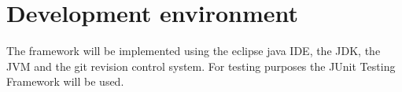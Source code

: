 \section{Development environment}

The framework will be implemented using the \Gls{eclipse} \gls{java} \gls{IDE}, the \Gls{JDK}, the \Gls{JVM} and the \Gls{git} revision control system. For testing purposes the JUnit Testing Framework will be used.

